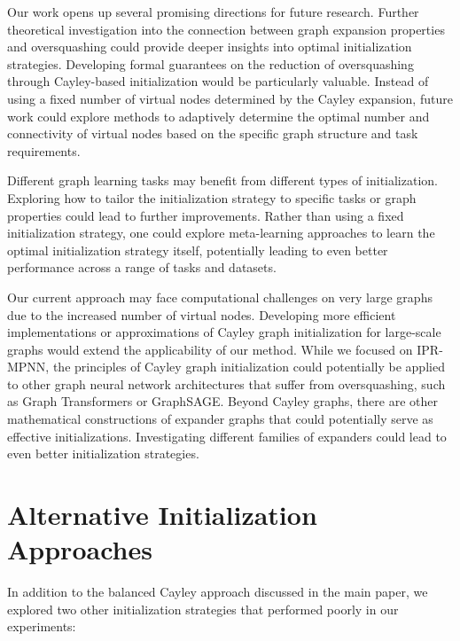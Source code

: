 \documentclass[11pt,a4paper]{article}
\begin{document}
Our work opens up several promising directions for future research. Further theoretical investigation into the connection between graph expansion properties and oversquashing could provide deeper insights into optimal initialization strategies. Developing formal guarantees on the reduction of oversquashing through Cayley-based initialization would be particularly valuable. Instead of using a fixed number of virtual nodes determined by the Cayley expansion, future work could explore methods to adaptively determine the optimal number and connectivity of virtual nodes based on the specific graph structure and task requirements.

Different graph learning tasks may benefit from different types of initialization. Exploring how to tailor the initialization strategy to specific tasks or graph properties could lead to further improvements. Rather than using a fixed initialization strategy, one could explore meta-learning approaches to learn the optimal initialization strategy itself, potentially leading to even better performance across a range of tasks and datasets.

Our current approach may face computational challenges on very large graphs due to the increased number of virtual nodes. Developing more efficient implementations or approximations of Cayley graph initialization for large-scale graphs would extend the applicability of our method. While we focused on IPR-MPNN, the principles of Cayley graph initialization could potentially be applied to other graph neural network architectures that suffer from oversquashing, such as Graph Transformers or GraphSAGE. Beyond Cayley graphs, there are other mathematical constructions of expander graphs that could potentially serve as effective initializations. Investigating different families of expanders could lead to even better initialization strategies.

\appendix
\section{Alternative Initialization Approaches}
\label{sec:appendix_alt_init}

In addition to the balanced Cayley approach discussed in the main paper, we explored two other initialization strategies that performed poorly in our experiments:
\end{document}
